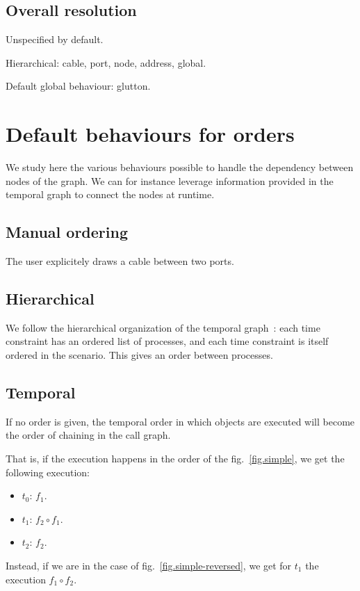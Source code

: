 \documentclass{article}
\begin{document}
    \subsection{Overall resolution}
    Unspecified by default. 
    
    Hierarchical: cable, port, node, address, global.
    
    Default global behaviour: glutton.
    
  
    \section{Default behaviours for orders}
    We study here the various behaviours possible to handle the dependency between nodes of the graph. 
    We can for instance leverage information provided in the temporal graph to connect the nodes at runtime. 
    
    \subsection{Manual ordering}
    The user explicitely draws a cable between two ports.
    
    \subsection{Hierarchical}
    We follow the hierarchical organization of the temporal graph~: each time constraint has an ordered list of processes, and each time constraint is itself ordered in the scenario. This gives an order between processes.
    
    \subsection{Temporal}
    If no order is given, the temporal order in which objects are executed
    will become the order of chaining in the call graph.
    
    That is, if the execution happens in the order of the fig.~\ref{fig.simple}, we get the following execution: 
    
    \begin{itemize}
        \item $t_0$: $f_1$.
        \item $t_1$: $f_2 \circ f_1$.
        \item $t_2$: $f_2$. 
    \end{itemize}

    Instead, if we are in the case of fig.~\ref{fig.simple-reversed}, we get for $t_1$ the execution $f_1 \circ f_2$.
    
\end{document}
